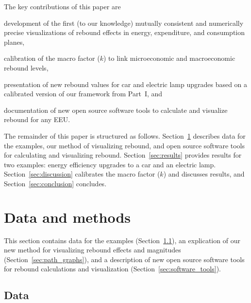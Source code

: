 \documentclass[12pt]{article}\usepackage[]{graphicx}\usepackage[]{xcolor}
\begin{document}
The key contributions of this paper are 
%
\begin{enumerate*}[label={(\roman*)}]
	
  \item development of the first (to our knowledge) 
        mutually consistent and numerically precise
        visualizations of rebound effects
        in energy, expenditure, and consumption planes,
        
  \item calibration of the macro factor ($k$) to link
        microeconomic and macroeconomic rebound levels,
        
  \item presentation of new rebound values for car and electric lamp 
        upgrades based on a calibrated version of our framework from Part~I, and 
        
  \item documentation of new open source software tools
        to calculate and visualize rebound 
        for any EEU.
  
\end{enumerate*}

The remainder of this paper is structured as follows.
Section~\ref{sec:methods} describes data for the examples, 
our method of visualizing rebound, and 
open source software tools for calculating and visualizing rebound.
Section~\ref{sec:results} provides results for two examples: 
energy efficiency upgrades to a car and an electric lamp.
Section~\ref{sec:discussion} calibrates the macro factor ($k$)
and discusses results, and 
Section~\ref{sec:conclusion} concludes.


\section{Data and methods}
\label{sec:methods}

This section contains data for the examples
(Section~\ref{sec:data}), 
an explication of our new method for visualizing rebound effects and magnitudes
(Section~\ref{sec:path_graphs}), and
a description of new open source software tools
for rebound calculations and visualization
(Section~\ref{sec:software_tools}).


\subsection{Data}
\label{sec:data}
\end{document}
